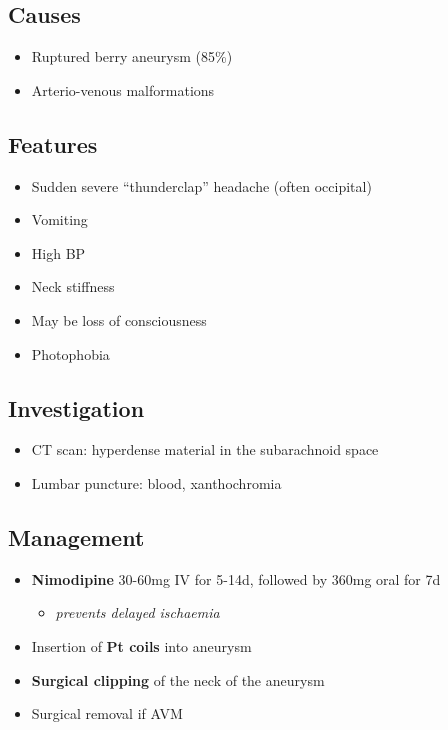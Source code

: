 \documentclass[
  12pt,
]{memoir}
\providecommand{\tightlist}{%
  \setlength{\itemsep}{0pt}\setlength{\parskip}{0pt}}
\begin{document}
\hypertarget{causes-8}{%
\subsection{Causes}\label{causes-8}}

\begin{itemize}
\tightlist
\item
  Ruptured berry aneurysm (85\%)
\item
  Arterio-venous malformations
\end{itemize}

\hypertarget{features-30}{%
\subsection{Features}\label{features-30}}

\begin{itemize}
\tightlist
\item
  Sudden severe ``thunderclap'' headache (often occipital)
\item
  Vomiting
\item
  High BP
\item
  Neck stiffness
\item
  May be loss of consciousness
\item
  Photophobia
\end{itemize}

\hypertarget{investigation-29}{%
\subsection{Investigation}\label{investigation-29}}

\begin{itemize}
\tightlist
\item
  CT scan: hyperdense material in the subarachnoid space
\item
  Lumbar puncture: blood, xanthochromia
\end{itemize}

\hypertarget{management-22}{%
\subsection{Management}\label{management-22}}

\begin{itemize}
\tightlist
\item
  \textbf{Nimodipine} 30-60mg IV for 5-14d, followed by 360mg oral for
  7d

  \begin{itemize}
  \tightlist
  \item
    \emph{prevents delayed ischaemia}
  \end{itemize}
\item
  Insertion of \textbf{Pt coils} into aneurysm
\item
  \textbf{Surgical clipping} of the neck of the aneurysm
\item
  Surgical removal if AVM
\end{itemize}
\end{document}
